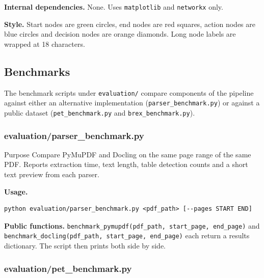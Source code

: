 \documentclass{article}
\begin{document}
\textbf{Internal dependencies.} None. Uses
\texttt{matplotlib} and \texttt{networkx} only.

\textbf{Style.} Start nodes are green circles, end nodes are red
squares, action nodes are blue circles and decision nodes are orange
diamonds. Long node labels are wrapped at 18 characters.

\subsection{Benchmarks}

The benchmark scripts under \texttt{evaluation/} compare components of
the pipeline against either an alternative implementation
(\texttt{parser\_benchmark.py}) or against a public dataset
(\texttt{pet\_benchmark.py} and \texttt{brex\_benchmark.py}).

\subsubsection{evaluation/parser\_benchmark.py}

\begin{codeconceptbox}{Purpose}
Compare PyMuPDF and Docling on the same page range of the same PDF.
Reports extraction time, text length, table detection counts and a
short text preview from each parser.
\end{codeconceptbox}

\textbf{Usage.}

\begin{tcolorbox}[colback=mygray, colframe=mygray, sharp corners, boxrule=0pt]
\begin{verbatim}
python evaluation/parser_benchmark.py <pdf_path> [--pages START END]
\end{verbatim}
\end{tcolorbox}

\textbf{Public functions.}
\texttt{benchmark\_pymupdf(pdf\_path, start\_page, end\_page)} and
\texttt{benchmark\_docling(pdf\_path, start\_page, end\_page)} each
return a results dictionary. The script then prints both side by
side.

\subsubsection{evaluation/pet\_benchmark.py}
\end{document}
